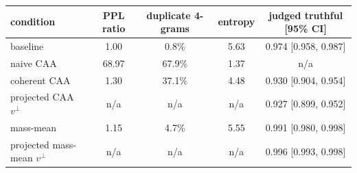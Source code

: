 \begin{tabular}{@{}lcccc@{}}
\toprule
condition & PPL ratio & duplicate 4-grams & entropy & judged truthful [95\% CI] \\
\midrule
baseline & 1.00 & 0.8\% & 5.63 & 0.974 [0.958, 0.987] \\
naive CAA & 68.97 & 67.9\% & 1.37 & n/a \\
coherent CAA & 1.30 & 37.1\% & 4.48 & 0.930 [0.904, 0.954] \\
projected CAA $v^{\perp}$ & n/a & n/a & n/a & 0.927 [0.899, 0.952] \\
mass-mean & 1.15 & 4.7\% & 5.55 & 0.991 [0.980, 0.998] \\
projected mass-mean $v^{\perp}$ & n/a & n/a & n/a & 0.996 [0.993, 0.998] \\
\bottomrule
\end{tabular}

